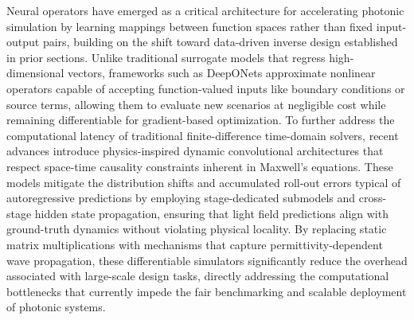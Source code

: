 Neural operators have emerged as a critical architecture for accelerating photonic simulation by learning mappings between function spaces rather than fixed input-output pairs, building on the shift toward data-driven inverse design established in prior sections. Unlike traditional surrogate models that regress high-dimensional vectors, frameworks such as DeepONets approximate nonlinear operators capable of accepting function-valued inputs like boundary conditions or source terms, allowing them to evaluate new scenarios at negligible cost while remaining differentiable for gradient-based optimization. \citep{doi_10_48550_arxiv_2406_05072_c02ad5f4} \citep{doi_10_1122_8_0000908_e28c4124} To further address the computational latency of traditional finite-difference time-domain solvers, recent advances introduce physics-inspired dynamic convolutional architectures that respect space-time causality constraints inherent in Maxwell's equations. These models mitigate the distribution shifts and accumulated roll-out errors typical of autoregressive predictions by employing stage-dedicated submodels and cross-stage hidden state propagation, ensuring that light field predictions align with ground-truth dynamics without violating physical locality. By replacing static matrix multiplications with mechanisms that capture permittivity-dependent wave propagation, these differentiable simulators significantly reduce the overhead associated with large-scale design tasks, directly addressing the computational bottlenecks that currently impede the fair benchmarking and scalable deployment of photonic systems. \citep{doi_10_48550_arxiv_2601_00199_c689b34d} \citep{doi_10_48550_arxiv_2406_17810_813bd2a3}

